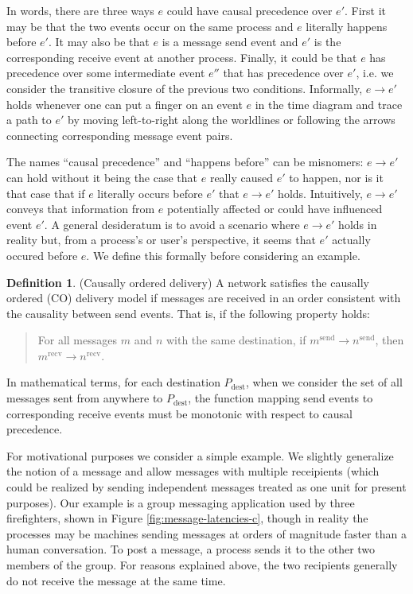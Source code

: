\documentclass[]             %
{NASA}                       %
\theoremstyle{definition}
\newtheorem{definition}{Definition}[section]
\begin{document}
In words, there are three ways $e$ could have causal precedence over
$e'$.  First it may be that the two events occur on the same process
and $e$ literally happens before $e'$. It may also be that $e$ is a
message send event and $e'$ is the corresponding receive event at
another process. Finally, it could be that $e$ has precedence over
some intermediate event $e''$ that has precedence over $e'$, i.e. we
consider the transitive closure of the previous two
conditions. Informally, $e \to e'$ holds whenever one can put a finger
on an event $e$ in the time diagram and trace a path to $e'$ by moving
left-to-right along the worldlines or following the arrows connecting
corresponding message event pairs.

The names ``causal precedence'' and ``happens before'' can be misnomers: $e
\to e'$ can hold without it being the case that $e$ really caused $e'$
to happen, nor is it that case that if $e$ literally occurs before
$e'$ that $e \to e'$ holds. Intuitively, $e \to e'$ conveys that
information from $e$ potentially affected or could have influenced
event $e'$. A general desideratum is to avoid a scenario where $e \to
e'$ holds in reality but, from a process's or user's perspective, it
seems that $e'$ actually occured before $e$. We define this formally
before considering an example.

\begin{definition}(Causally ordered delivery)
  \label{def:causalorder}
  A network satisfies the causally ordered (CO) delivery model if
  messages are received in an order consistent with the causality
  between send events. That is, if the following property holds:
  \begin{quote}
  For all messages $m$ and $n$ with the same destination, if
  $m^\textrm{send} \to n^\textrm{send}$, then $m^\textrm{recv} \to
  n^\textrm{recv}$.
  \end{quote}
  In mathematical terms, for each destination $P_\mathrm{dest}$, when
  we consider the set of all messages sent from anywhere to
  $P_\mathrm{dest}$, the function mapping send events to corresponding
  receive events must be monotonic with respect to causal
  precedence.
\end{definition}

For motivational purposes we consider a simple example. We slightly
generalize the notion of a message and allow messages with multiple
receipients (which could be realized by sending independent messages
treated as one unit for present purposes). Our example is a group
messaging application used by three firefighters, shown in Figure
\ref{fig:message-latencies-c}, though in reality the processes may be
machines sending messages at orders of magnitude faster than a human
conversation. To post a message, a process sends it to the other two
members of the group. For reasons explained above, the two recipients
generally do not receive the message at the same time.
\end{document}
